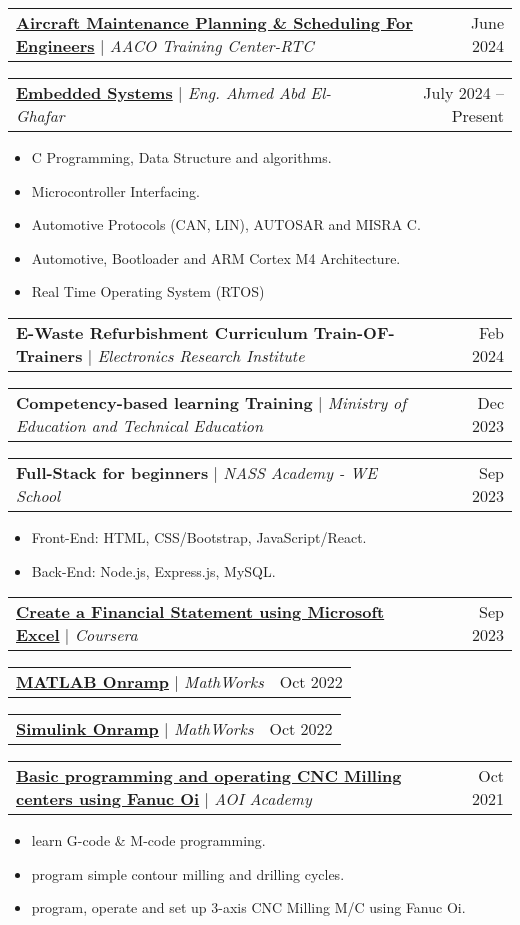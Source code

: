 \documentclass[letterpaper,11pt]{article}
\makeatletter
\newcommand{\resumeItem}[1]{
  \item\small{
    {#1 \vspace{-2pt}}
  }
}
\newcommand{\resumeProjectHeading}[2]{
    \item
    \begin{tabular*}{0.97\textwidth}{l@{\extracolsep{\fill}}r}
      \small#1 & #2 \\
    \end{tabular*}\vspace{-7pt}
}
\newcommand{\resumeSubItem}[1]{\resumeItem{#1}\vspace{-4pt}}
\newcommand{\resumeItemListStart}{\begin{itemize}}
\newcommand{\resumeItemListEnd}{\end{itemize}\vspace{-5pt}}
\makeatother
\begin{document}
    \resumeProjectHeading
      {\textbf{\href{https://training.egyptair.com/CRM/Catalog/55200}{Aircraft Maintenance Planning \& Scheduling For Engineers}} $|$ \emph{AACO Training Center-RTC}}{June 2024}
    
    \resumeProjectHeading
      {\textbf{\href{https://docs.google.com/document/d/1X7FlRX-Re-GHMI3wuXc9e37jJEGl_DlxNb-6NCMlmgo/edit?usp=sharing}{Embedded Systems}} $|$ \emph{Eng. Ahmed Abd El-Ghafar}}{July 2024 -- Present}
      \resumeItemListStart
        \resumeItem{C Programming, Data Structure and algorithms.}
        \resumeItem{Microcontroller Interfacing.}
        \resumeItem{Automotive Protocols (CAN, LIN), AUTOSAR and MISRA C.}
        \resumeItem{Automotive, Bootloader and ARM Cortex M4 Architecture.}
        \resumeItem{Real Time Operating System (RTOS)}
      \resumeItemListEnd
    
    \resumeProjectHeading
      {\textbf{E-Waste Refurbishment Curriculum Train-OF-Trainers} $|$ \emph{Electronics Research Institute}}{Feb 2024}

    \resumeProjectHeading
      {\textbf{Competency-based learning Training} $|$ \emph{Ministry of Education and Technical Education}}{Dec 2023}

    \resumeProjectHeading
      {\textbf{Full-Stack for beginners} $|$ \emph{NASS Academy - WE School}}{Sep 2023}
      \resumeItemListStart
        \resumeItem{Front-End: HTML, CSS/Bootstrap, JavaScript/React.}
        \resumeItem{Back-End: Node.js, Express.js, MySQL.}
      \resumeItemListEnd
    
    \resumeProjectHeading
      {\textbf{\href{https://www.coursera.org/projects/create-financial-statement-using-microsoft-excel}{Create a Financial Statement using Microsoft Excel}} $|$ \emph{Coursera}}{Sep 2023}

    \resumeProjectHeading
      {\textbf{\href{https://matlabacademy.mathworks.com/details/matlab-onramp/gettingstarted}{MATLAB Onramp}} $|$ \emph{MathWorks}}{Oct 2022}
    
    \resumeProjectHeading
      {\textbf{\href{https://matlabacademy.mathworks.com/details/simulink-onramp/simulink}{Simulink Onramp}} $|$ \emph{MathWorks}}{Oct 2022}

    \resumeProjectHeading
      {\textbf{\href{https://drive.google.com/drive/folders/1gKIz-PYpO2zrjnvkzoYVhijYoGJP7P9j?usp=sharing}{Basic programming and operating CNC Milling centers using Fanuc Oi}} $|$ \emph{AOI Academy}}{Oct 2021}
      \resumeItemListStart
        \resumeItem{learn G-code \& M-code programming.}
        \resumeItem{program simple contour milling and drilling cycles.}
        \resumeSubItem{program, operate and set up 3-axis CNC Milling M/C using Fanuc Oi.}
      \resumeItemListEnd
\end{document}
